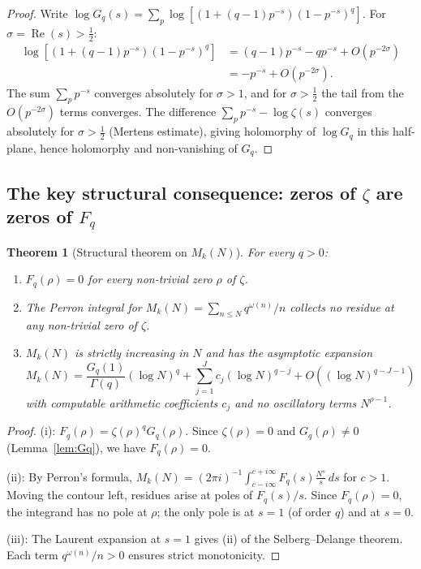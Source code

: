 \documentclass[11pt]{amsart}
\newtheorem{theorem}{Theorem}[section]
\theoremstyle{definition}
\theoremstyle{remark}
\renewcommand{\Re}{\operatorname{Re}}
\newcommand{\half}{\tfrac{1}{2}}
\newcommand{\om}{\omega}
\newcommand{\sig}{\sigma}
\begin{document}
\begin{proof}
Write $\log G_q(s) = \sum_p \log[(1+(q-1)p^{-s})(1-p^{-s})^q]$.
For $\sig = \Re(s) > \half$:
\begin{align*}
\log[(1+(q-1)p^{-s})(1-p^{-s})^q]
&= (q-1)p^{-s} - qp^{-s} + O(p^{-2\sig}) \\
&= -p^{-s} + O(p^{-2\sig}).
\end{align*}
The sum $\sum_p p^{-s}$ converges absolutely for $\sig > 1$, and for $\sig > \half$
the tail from the $O(p^{-2\sig})$ terms converges.  The difference $\sum_p p^{-s} -
\log\zeta(s)$ converges absolutely for $\sig > \half$ (Mertens estimate), giving
holomorphy of $\log G_q$ in this half-plane, hence holomorphy and non-vanishing of $G_q$.
\end{proof}

\subsection{The key structural consequence: zeros of $\zeta$ are zeros of $F_q$}
\label{ss:zerosofzeros}

\begin{theorem}[Structural theorem on $M_k(N)$]
\label{thm:Mk-monotone}
For every $q > 0$:
\begin{enumerate}[label=\upshape(\roman*)]
  \item $F_q(\rho) = 0$ for every non-trivial zero $\rho$ of $\zeta$.
  \item The Perron integral for $M_k(N) = \sum_{n\le N} q^{\om(n)}/n$ collects no
    residue at any non-trivial zero of $\zeta$.
  \item $M_k(N)$ is strictly increasing in $N$ and has the asymptotic expansion
    \[
      M_k(N) = \frac{G_q(1)}{\Gamma(q)}(\log N)^q
      + \sum_{j=1}^{J} c_j (\log N)^{q-j} + O((\log N)^{q-J-1})
    \]
    with computable arithmetic coefficients $c_j$ and no oscillatory terms $N^{\rho-1}$.
\end{enumerate}
\end{theorem}

\begin{proof}
(i): $F_q(\rho) = \zeta(\rho)^q G_q(\rho)$.  Since $\zeta(\rho)=0$ and $G_q(\rho)\ne 0$
(Lemma~\ref{lem:Gq}), we have $F_q(\rho)=0$.

(ii): By Perron's formula,
$M_k(N) = (2\pi i)^{-1}\int_{c-i\infty}^{c+i\infty} F_q(s)\frac{N^s}{s}\,ds$
for $c>1$.  Moving the contour left, residues arise at poles of $F_q(s)/s$.  Since
$F_q(\rho)=0$, the integrand has no pole at $\rho$; the only pole is at $s=1$
(of order $q$) and at $s=0$.

(iii): The Laurent expansion at $s=1$ gives (ii) of the Selberg--Delange theorem.
Each term $q^{\om(n)}/n > 0$ ensures strict monotonicity.
\end{proof}
\end{document}
